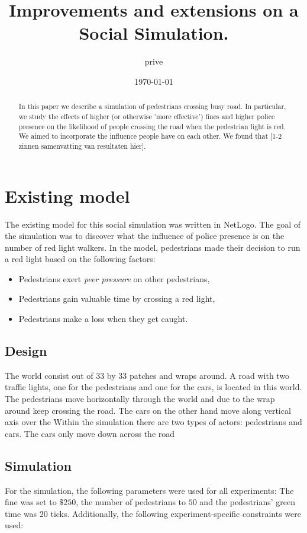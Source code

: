 \documentclass[a4paper]{article}
\title{Improvements and extensions on a Social Simulation.}
\author{prive}
\date{\today}
\begin{document}
\maketitle

\begin{abstract}
	In this paper we describe a simulation of pedestrians crossing busy road. In particular, we study the effects of higher (or otherwise 'more effective') fines and higher police presence on the likelihood of people crossing the road when the pedestrian light is red. We aimed to incorporate the influence people have on each other. We found that [1-2 zinnen samenvatting van resultaten hier].
\end{abstract}

\clearpage
\tableofcontents
\clearpage

\section{Existing model}
The existing model for this social simulation was written in NetLogo. The goal of the simulation was to discover what the influence of police presence is on the number of red light walkers. In the model, pedestrians made their decision to run a red light based on the following factors:
\begin{itemize}
\item Pedestrians exert \textit{peer pressure} on other pedestrians,
\item Pedestrians gain valuable time by crossing a red light,
\item Pedestrians make a loss when they get caught.
\end{itemize}

\subsection{Design}
The world consist out of 33 by 33 patches and wraps around. A road with two traffic lights, one for the pedestrians and one for the cars, is located in this world. The pedestrians move horizontally through the world and due to the wrap around keep crossing the road. The cars on the other hand move along vertical axis over the Within the simulation there are two types of actors: pedestrians and cars. The cars only move down across the road 

\subsection{Simulation}
\label{sec:initialsim}
For the simulation, the following parameters were used for all experiments: The fine was set to $\$250$, the number of pedestrians to $50$ and the pedestrians' green time was $20$ ticks. Additionally, the following experiment-specific constraints were used:\\
\end{document}
